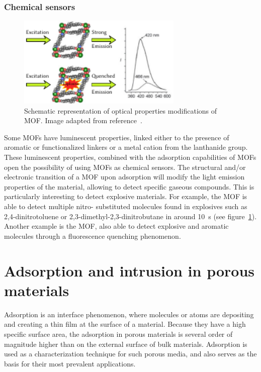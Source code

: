 \documentclass[thesis]{subfiles}
\begin{document}
\subsubsection{Chemical sensors}

\begin{figure}[ht]
    \centering
    \includegraphics[width=0.7\textwidth]{figures/cited/chemical-sensor}
    \caption{Schematic representation of optical properties modifications of
     MOF. Image adapted from reference~\cite{Lan2009}.}
    \label{fig:chemical-sensor}
\end{figure}

Some MOFs have luminescent properties, linked either to the presence of aromatic
or functionalized linkers or a metal cation from the lanthanide group. These
luminescent properties, combined with the adsorption capabilities of MOFs open
the possibility of using MOFs as chemical sensors. The structural and/or
electronic transition of a MOF upon adsorption will modify the light emission
properties of the material, allowing to detect specific gaseous compounds. This
is particularly interesting to detect explosive materials. For example, the
 MOF is able to detect multiple nitro- substituted
molecules found in explosives such as 2,4-dinitrotoluene or
2,3-dimethyl-2,3-dinitrobutane in around \SI{10}{s}\cite{Lan2009} (see
figure~\ref{fig:chemical-sensor}). Another example is the 
MOF, also able to detect explosive and aromatic molecules through a fluorescence
quenching phenomenon\cite{Pramanik2011}.

\newpage
\section{Adsorption and intrusion in porous materials}

Adsorption is an interface phenomenon, where molecules or atoms are depositing
and creating a thin film at the surface of a material. Because they have a high
specific surface area, the adsorption in porous materials is several order of
magnitude higher than on the external surface of bulk materials. Adsorption is
used as a characterization technique for such porous media, and also serves as
the basis for their most prevalent applications.
\end{document}

